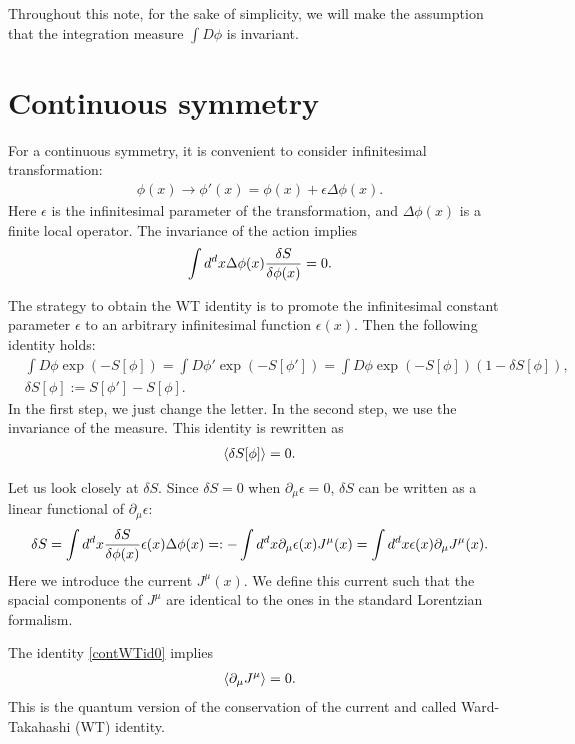 \documentclass[12pt]{scrartcl}
\newcommand{\del}{\partial}
\begin{document}
Throughout this note, for the sake of simplicity, we will make the assumption that the integration measure $\int D\phi $ is invariant.

\section{Continuous symmetry}
For a continuous symmetry, it is convenient to consider infinitesimal transformation:
\begin{align}
    \phi(x)\to \phi'(x)=\phi(x)+\epsilon \Delta \phi(x).
\end{align}
Here $\epsilon$ is the infinitesimal parameter of the transformation, and $\Delta \phi(x)$ is a finite local operator.
The invariance of the action implies
\begin{align}
    \int d^dx\Delta \phi(x)\fdv{S}{\phi(x)}=0.
\end{align}

The strategy to obtain the WT identity is to promote the infinitesimal constant parameter $\epsilon$ to an arbitrary infinitesimal function $\epsilon(x)$.  Then the following identity holds:
\begin{align}
    &\int D\phi \exp(-S[\phi])=
    \int D\phi' \exp(-S[\phi'])=
    \int D\phi \exp(-S[\phi]) (1-\delta S[\phi]),\\
    &\delta S[\phi]:=S[\phi']-S[\phi].
\end{align}
In the first step, we just change the letter.  In the second step, we use the invariance of the measure.
This identity is rewritten as
\begin{align}
    \expval{\delta S[\phi]}=0.
    \label{contWTid0}
\end{align}

Let us look closely at $\delta S$.  Since $\delta S=0$ when $\del_{\mu}\epsilon=0$,  $\delta S$ can be written as a linear functional of $\del_{\mu}\epsilon$:
\begin{align}
    \delta S=\int d^dx \fdv{S}{\phi(x)}\epsilon(x)\Delta\phi(x)
    =:-\int d^d x\del_{\mu}\epsilon(x) J^{\mu}(x)=
    \int d^dx \epsilon(x)\del_{\mu}J^{\mu}(x).\label{defcurrent}
\end{align}
Here we introduce the current $J^{\mu}(x)$.  We define this current such that the spacial components of $J^{\mu}$ are identical to the ones in the standard Lorentzian formalism.

The identity \eqref{contWTid0} implies
\begin{align}
    \expval{\del_{\mu}J^{\mu}}=0.
\end{align}
This is the quantum version of the conservation of the current and called Ward-Takahashi (WT) identity.
\end{document}
